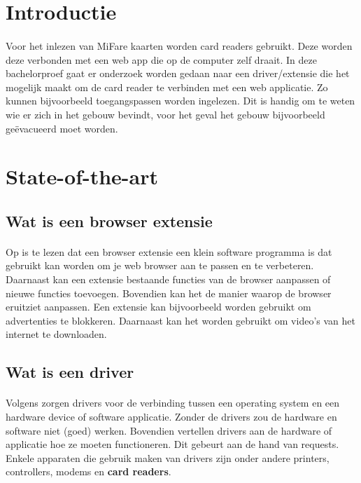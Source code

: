 
\section{Introductie}%
\label{sec:introductie}
\paragraph{}
Voor het inlezen van MiFare kaarten worden card readers gebruikt. Deze worden deze verbonden met een web app die op de computer zelf draait. In deze bachelorproef gaat er onderzoek worden gedaan naar een driver/extensie die het mogelijk maakt om de card reader te verbinden met een web applicatie. Zo kunnen bijvoorbeeld toegangspassen worden ingelezen. Dit is handig om te weten wie er zich in het gebouw bevindt, voor het geval het gebouw bijvoorbeeld geëvacueerd moet worden.


\section{State-of-the-art}%
\label{sec:state-of-the-art}

\bigskip
\subsection{Wat is een browser extensie}
\paragraph{}
Op \textcite{Desktop.com} is te lezen dat een browser extensie een klein software programma is dat gebruikt kan worden om je web browser aan te passen en te verbeteren. Daarnaast kan een extensie bestaande functies van de browser aanpassen of nieuwe functies toevoegen. Bovendien kan het de manier waarop de browser eruitziet aanpassen.
Een extensie kan bijvoorbeeld worden gebruikt om advertenties te blokkeren. Daarnaast kan het worden gebruikt om video's van het internet te downloaden.

\bigskip
\subsection{Wat is een driver}
\paragraph{}
Volgens \textcite{Webopedia} zorgen drivers voor de verbinding tussen een operating system en een hardware device of software applicatie. Zonder de drivers zou de hardware en software niet (goed) werken. Bovendien vertellen drivers aan de hardware of applicatie hoe ze moeten functioneren. Dit gebeurt aan de hand van requests. Enkele apparaten die gebruik maken van drivers zijn onder andere printers, controllers, modems en \textbf{card readers}.

